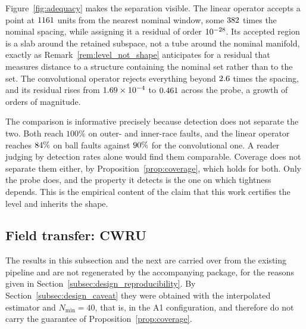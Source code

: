 \documentclass[a4paper]{cas-sc}
\begin{document}
Figure~\ref{fig:adequacy} makes the separation visible. The linear operator
accepts a point at \(1161\) units from the nearest nominal
window, some \(382\) times the nominal spacing, while assigning it a residual
of order \(10^{-28}\). Its accepted region is a slab around the retained
subspace, not a tube around the nominal manifold, exactly as
Remark~\ref{rem:level_not_shape} anticipates for a residual that measures
distance to a structure containing the nominal set rather than to the set.
The convolutional operator rejects everything beyond \(2.6\) times the
spacing, and its residual rises from \(1.69\times10^{-4}\) to \(0.461\) across
the probe, a growth of \adqConvGrowthOrders{} orders of magnitude.

The comparison is informative precisely because detection does not separate
the two. Both reach \(100\%\) on outer- and inner-race faults, and the linear
operator reaches \(84\%\) on ball faults against \(90\%\) for the
convolutional one. A reader judging by detection rates alone would find them
comparable. Coverage does not separate them either, by
Proposition~\ref{prop:coverage}, which holds for both. Only the probe does,
and the property it detects is the one on which tightness depends. This is the
empirical content of the claim that this work certifies the level and inherits
the shape.

\subsection{Field transfer: CWRU}
\label{subsec:results_cwru}


The results in this subsection and the next are carried over from the existing
pipeline and are not regenerated by the accompanying package, for the reasons
given in Section~\ref{subsec:design_reproducibility}. By
Section~\ref{subsec:design_caveat} they were obtained with the interpolated
estimator and \(N_{\min}=40\), that is, in the A1 configuration, and therefore
do not carry the guarantee of Proposition~\ref{prop:coverage}.
\end{document}

